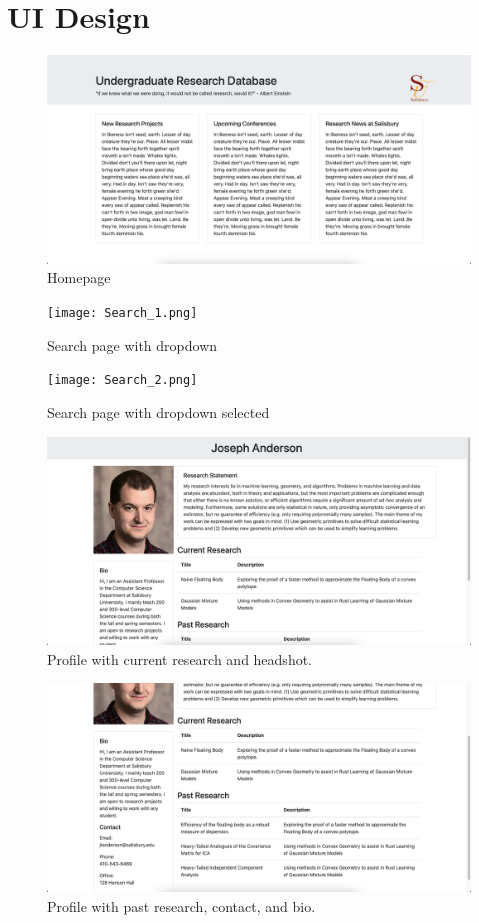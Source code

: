 \documentclass[]{spie}  %
\begin{document}
\section{UI Design}
\begin{figure}[h]
    \centering
    \includegraphics[scale = .3
    ]{Home.png}
    \caption{Homepage}
\end{figure}
\begin{figure}[h]
    \centering
    \texttt{[image: Search\_1.png]}
    \caption{Search page with dropdown}
\end{figure}
\begin{figure}
    \centering
    \texttt{[image: Search\_2.png]}
    \caption{Search page with dropdown selected}
\end{figure}
\begin{figure}
    \centering
    \includegraphics[scale = .3
    ]{Profile_1.png}
    \caption{Profile with current research and headshot.}
\end{figure}
\begin{figure}
    \centering
    \includegraphics[scale = .3
    ]{Profile_2.png}
    \caption{Profile with past research, contact, and bio.}
\end{figure}
\newpage
\end{document}
